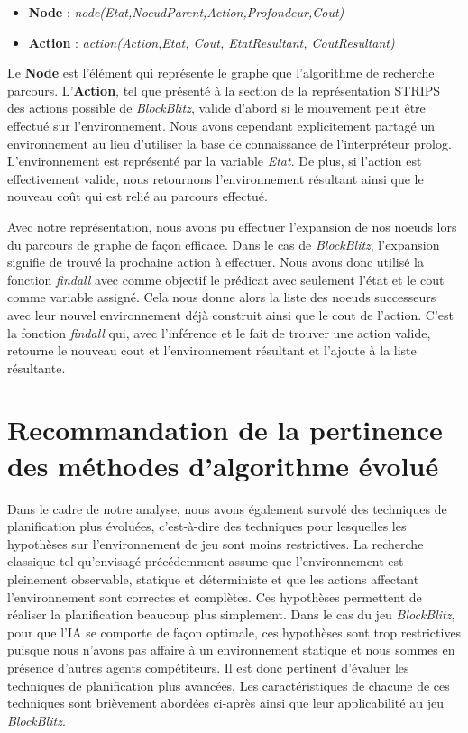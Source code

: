 \documentclass[12pt,english,frenchb,letterpaper]{article}
\begin{document}
\begin{itemize}
\item \textbf{Node} : \textit{node(Etat,NoeudParent,Action,Profondeur,Cout)}
\item \textbf{Action} : \textit{action(Action,Etat, Cout, EtatResultant, CoutResultant)}
\end{itemize}

Le \textbf{Node} est l'élément qui représente le graphe que l'algorithme de recherche parcours. L'\textbf{Action}, tel que présenté à la section de la représentation STRIPS des actions possible de \textit{BlockBlitz}, valide d'abord si le mouvement peut être effectué sur l'environnement. Nous avons cependant explicitement partagé un environnement au lieu d'utiliser la base de connaissance de l'interpréteur prolog. L'environnement est représenté par la variable \textit{Etat}. De plus, si l'action est effectivement valide, nous retournons l'environnement résultant ainsi que le nouveau coût qui est relié au parcours effectué.

Avec notre représentation, nous avons pu effectuer l'expansion de nos noeuds lors du parcours de graphe de façon efficace. Dans le cas de \textit{BlockBlitz}, l'expansion signifie de trouvé la prochaine action à effectuer. Nous avons donc utilisé la fonction \textit{findall} avec comme objectif le prédicat avec seulement l'état et le cout comme variable assigné. Cela nous donne alors la liste des noeuds successeurs avec leur nouvel environnement déjà construit ainsi que le cout de l'action. C'est la fonction \textit{findall} qui, avec l'inférence et le fait de trouver une action valide, retourne le nouveau cout et l'environnement résultant et l'ajoute à la liste résultante.


\section{Recommandation de la pertinence des méthodes d'algorithme évolué}

Dans le cadre de notre analyse, nous avons également survolé des techniques de planification plus évoluées, c'est-à-dire des techniques pour lesquelles les hypothèses sur l'environnement de jeu sont moins restrictives.  La recherche classique tel qu'envisagé précédemment assume que l'environnement est pleinement observable, statique et déterministe et que les actions affectant l'environnement sont correctes et complètes. Ces hypothèses permettent de réaliser la planification beaucoup plus simplement.
Dans le cas du jeu \textit{BlockBlitz}, pour que l'IA se comporte de fa\c con optimale, ces hypothèses sont trop restrictives puisque nous n'avons pas affaire à un environnement statique et nous sommes en présence d'autres agents compétiteurs.  Il est donc pertinent d'évaluer les techniques de planification plus avancées.  Les caractéristiques de chacune de ces techniques sont brièvement abordées ci-après ainsi que leur applicabilité au jeu \textit{BlockBlitz}.
\end{document}
